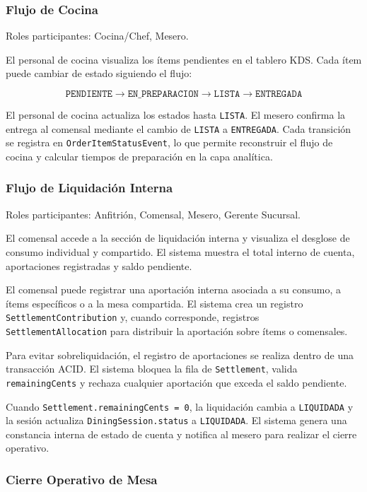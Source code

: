 \subsubsection{Flujo de Cocina}

Roles participantes: Cocina/Chef, Mesero.

El personal de cocina visualiza los ítems pendientes en el tablero KDS. Cada ítem puede
cambiar de estado siguiendo el flujo:

\[
\texttt{PENDIENTE} \rightarrow \texttt{EN\_PREPARACION} \rightarrow \texttt{LISTA}
\rightarrow \texttt{ENTREGADA}
\]

El personal de cocina actualiza los estados hasta \texttt{LISTA}. El mesero confirma la
entrega al comensal mediante el cambio de \texttt{LISTA} a \texttt{ENTREGADA}. Cada
transición se registra en \texttt{OrderItemStatusEvent}, lo que permite reconstruir el
flujo de cocina y calcular tiempos de preparación en la capa analítica.

\subsubsection{Flujo de Liquidación Interna}

Roles participantes: Anfitrión, Comensal, Mesero, Gerente Sucursal.

El comensal accede a la sección de liquidación interna y visualiza el desglose de consumo
individual y compartido. El sistema muestra el total interno de cuenta, aportaciones
registradas y saldo pendiente.

El comensal puede registrar una aportación interna asociada a su consumo, a ítems
específicos o a la mesa compartida. El sistema crea un registro
\texttt{SettlementContribution} y, cuando corresponde, registros
\texttt{SettlementAllocation} para distribuir la aportación sobre ítems o comensales.

Para evitar sobreliquidación, el registro de aportaciones se realiza dentro de una
transacción ACID. El sistema bloquea la fila de \texttt{Settlement}, valida
\texttt{remainingCents} y rechaza cualquier aportación que exceda el saldo pendiente.

Cuando \texttt{Settlement.remainingCents = 0}, la liquidación cambia a
\texttt{LIQUIDADA} y la sesión actualiza \texttt{DiningSession.status} a
\texttt{LIQUIDADA}. El sistema genera una constancia interna de estado de cuenta y
notifica al mesero para realizar el cierre operativo.

\subsubsection{Cierre Operativo de Mesa}


